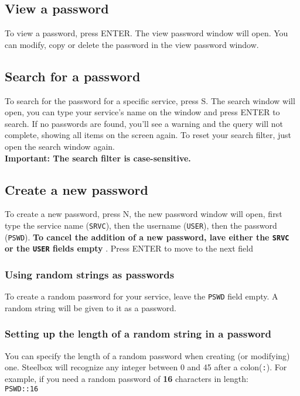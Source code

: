 \documentclass{article}
\begin{document}
  \subsection{View a password}
  To view a password, press ENTER. The view password window will open. You can modify, copy or delete the password in the view password window.


  \subsection{Search for a password}
  To search for the password for a specific service, press S. The search window will open, you can type your service's name on the window
  and press ENTER to search. If no passwords are found, you'll see a warning and the query will not complete, showing all items on the
  screen again. To reset your search filter, just open the search window again.\\
  \textbf{Important: The search filter is case-sensitive.}

  \subsection{Create a new password}
  To create a new password, press N, the new password window will open, first type the service name (\texttt{SRVC}), then the username (\texttt{USER}),
  then the password (\texttt{PSWD}). \textbf{To cancel the addition of a new password, lave either the \texttt{SRVC} or the \texttt{USER} fields
  empty }. Press ENTER to move to the next field

  \subsubsection{Using random strings as passwords}
  To create a random password for your service, leave the \texttt{PSWD} field empty. A random string will be given to it as a password.

  \subsubsection{Setting up the length of a random string in a password}
  You can specify the length of a random password when creating (or modifying) one. Steelbox will recognize any integer between 0 and
  45 after a colon(\texttt{:}). For example, if you need a random password of \textbf{16} characters in length:\\
  \texttt{PSWD::16}
\end{document}
